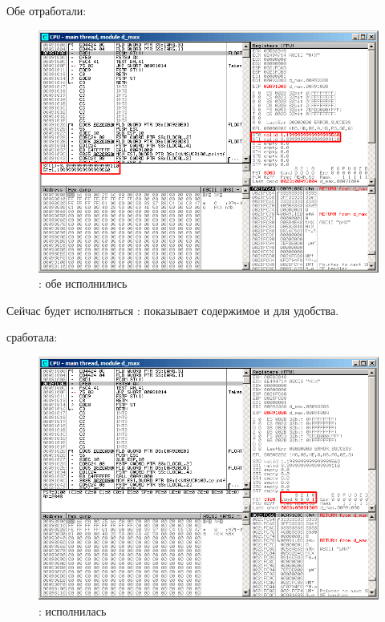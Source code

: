 ﻿\clearpage
{}
\myindex{\olly}

Обе \FLD отработали:

\begin{figure}[H]
\centering
\includegraphics[scale=\FigScale]{patterns/12_FPU/3_comparison/x86/MSVC_Ox/olly1_1.png}
\caption{\olly: обе \FLD исполнились}
\label{fig:FPU_comparison_Ox_case1_olly1}
\end{figure}

Сейчас будет исполняться \FCOM: 
\olly показывает содержимое  и  для удобства.

\clearpage
\FCOM сработала:

\begin{figure}[H]
\centering
\includegraphics[scale=\FigScale]{patterns/12_FPU/3_comparison/x86/MSVC_Ox/olly1_2.png}
\caption{\olly: \FCOM исполнилась}
\label{fig:FPU_comparison_Ox_case1_olly2}
\end{figure}

